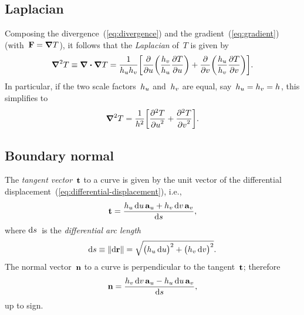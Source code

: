\subsection{Laplacian}
\label{sec:curvilinear.calculus.laplacian}

Composing the divergence~(\ref{eq:divergence})
and the gradient~(\ref{eq:gradient}) (with~$\boldsymbol{\mathrm{F}} = \mathop{}\!\boldsymbol{\mathrm{\nabla}} T$),
it follows that the \emph{Laplacian} of~$T$ is given by
\begin{equation}
  \del^2 T \defeq \del \dotp \del T =
    \frac{1}{\scalefac{u} \scalefac{v}}
    \squarebr*{
      \pder{}{u} \roundbr*{\frac{\scalefac{v}}{\scalefac{u}} \pder{T}{u}}
        +
      \pder{}{v} \roundbr*{\frac{\scalefac{u}}{\scalefac{v}} \pder{T}{v}}
    }.
  \label{eq:laplacian}
\end{equation}
In particular,
if the two scale factors~$h_{u}$ and~$h_{v}$ are equal,
say~$h_{u} = h_{v} = h_{}$,
this simplifies to
\begin{equation}
  \del^2 T =
    \frac{1}{\scalefac{}^2}
    \squarebr*{\frac{\pd^2 T}{{\pd u}^2} + \frac{\pd^2 T}{{\pd v}^2}}.
  \label{eq:laplacian-scale-factors-equal}
\end{equation}

\subsection{Boundary normal}
\label{sec:curvilinear.calculus.normal}

The \emph{tangent vector}~$\mathop{}\!\boldsymbol{\mathrm{t}}$ to a curve
is given by the unit vector of
the differential displacement~(\ref{eq:differential-displacement}),
i.e.,
\begin{equation}
  \tangentvec =
    \frac{
      \scalefac{u} \td u \basisvec{u}
        +
      \scalefac{v} \td v \basisvec{v}
    }{
      \td s
    },
  \label{eq:tangent-vector}
\end{equation}
where $\mathop{}\!\mathrm{d} s$~is the \emph{differential arc length}
\begin{equation}
  \td s \defeq \norm{\td \vec{r}} =
  \sqrt{
    \roundbr[\big]{\scalefac{u} \td u}^2
      +
    \roundbr[\big]{\scalefac{v} \td v}^2
  }.
  \label{eq:differential-arc-length}
\end{equation}
The normal vector~$\mathop{}\!\boldsymbol{\mathrm{n}}$ to a curve
is perpendicular to the tangent~$\mathop{}\!\boldsymbol{\mathrm{t}}$;
therefore
\begin{equation}
  \normalvec =
    \frac{
      \scalefac{v} \td v \basisvec{u}
        -
      \scalefac{u} \td u \basisvec{v}
    }{
      \td s
    },
  \label{eq:normal-vector}
\end{equation}
up to sign.

